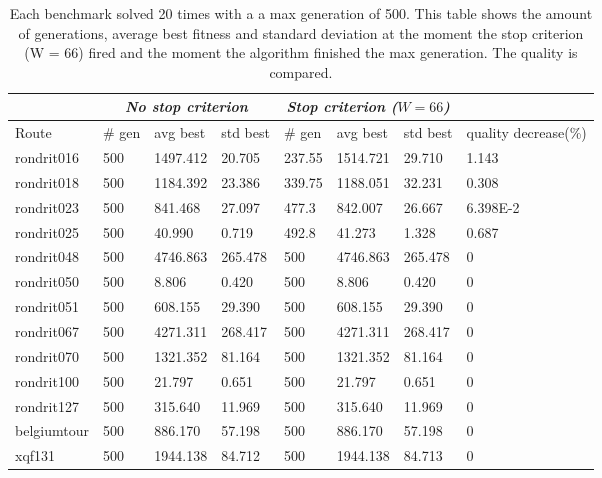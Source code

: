 \begin{table}[ht!]
    \centering
    \begin{tabular}{l | l | l | l | l | l | l | l }
     & \multicolumn{3}{c|}{\textit{No stop criterion}} & \multicolumn{3}{c|}{\textit{Stop criterion ($W = 66$)}} & \\
    \hline
	Route & \# gen & avg best & std best & \# gen & avg best & std best & quality decrease(\%) \\ \hline
	rondrit016 & 500 & 1497.412 & 20.705 & 237.55 & 1514.721 & 29.710 & 1.143 \  \\ \hline
	rondrit018 & 500 & 1184.392 & 23.386 & 339.75 & 1188.051 & 32.231 & 0.308 \  \\ \hline
	rondrit023 & 500 & 841.468 & 27.097 & 477.3 & 842.007 & 26.667 & 6.398E-2 \  \\ \hline
	rondrit025 & 500 & 40.990 & 0.719 & 492.8 & 41.273 & 1.328 & 0.687 \  \\ \hline
	rondrit048 & 500 & 4746.863 & 265.478 & 500 & 4746.863 & 265.478 & 0 \  \\ \hline
	rondrit050 & 500 & 8.806 & 0.420 & 500 & 8.806 & 0.420 & 0 \  \\ \hline
	rondrit051 & 500 & 608.155 & 29.390 & 500 & 608.155 & 29.390 & 0 \  \\ \hline
	rondrit067 & 500 & 4271.311 & 268.417 & 500 & 4271.311 & 268.417 & 0 \  \\ \hline
	rondrit070 & 500 & 1321.352 & 81.164 & 500 & 1321.352 & 81.164 & 0 \  \\ \hline
	rondrit100 & 500 & 21.797 & 0.651 & 500 & 21.797 & 0.651 & 0 \  \\ \hline
	rondrit127 & 500 & 315.640 & 11.969 & 500 & 315.640 & 11.969 & 0 \  \\ \hline
	belgiumtour & 500 & 886.170 & 57.198 & 500 & 886.170 & 57.198 & 0 \  \\ \hline
	xqf131 & 500 & 1944.138 & 84.712 & 500 & 1944.138 & 84.713 & 0 \  
    \end{tabular}
    \caption{Each benchmark solved 20 times with a a max generation of 500. This table shows the amount of generations, average best fitness and standard deviation at the moment the stop criterion (W = 66) fired and the moment the algorithm finished the max generation. The quality is compared.}
    \label{tab:window66}
\end{table}

